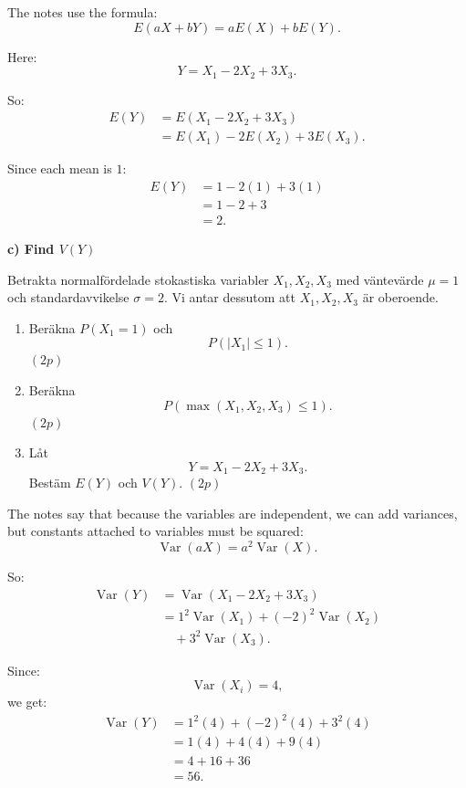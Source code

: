 \documentclass[10pt]{article}
\begin{document}
The notes use the formula:
\[
E(aX+bY)=aE(X)+bE(Y).
\]

Here:
\[
Y=X_1-2X_2+3X_3.
\]

So:
\begin{align*}
E(Y)
&=
E(X_1-2X_2+3X_3)
\\[2mm]
&=
E(X_1)-2E(X_2)+3E(X_3).
\end{align*}

Since each mean is \(1\):
\begin{align*}
E(Y)
&=
1-2(1)+3(1)
\\[2mm]
&=
1-2+3
\\[2mm]
&=
2.
\end{align*}

\textbf{c) Find \(V(Y)\)}

Betrakta normalfördelade stokastiska variabler
\(X_1,X_2,X_3\) med väntevärde \(\mu=1\) och
standardavvikelse \(\sigma=2\). Vi antar dessutom
att \(X_1,X_2,X_3\) är oberoende.

\begin{enumerate}[label=\alph*)]
\item Beräkna \(P(X_1=1)\) och
\[
P(|X_1|\le 1).
\]
\((2p)\)

\item Beräkna
\[
P(\max(X_1,X_2,X_3)\le 1).
\]
\((2p)\)

\item Låt
\[
Y=X_1-2X_2+3X_3.
\]
Bestäm \(E(Y)\) och \(V(Y)\). \((2p)\)
\end{enumerate}

The notes say that because the variables are
independent, we can add variances, but constants
attached to variables must be squared:
\[
\operatorname{Var}(aX)=a^2\operatorname{Var}(X).
\]

So:
\begin{align*}
\operatorname{Var}(Y)
&=
\operatorname{Var}(X_1-2X_2+3X_3)
\\[2mm]
&=
1^2\operatorname{Var}(X_1)
+(-2)^2\operatorname{Var}(X_2)
\\
&\quad
+3^2\operatorname{Var}(X_3).
\end{align*}

Since:
\[
\operatorname{Var}(X_i)=4,
\]
we get:
\begin{align*}
\operatorname{Var}(Y)
&=
1^2(4)+(-2)^2(4)+3^2(4)
\\[2mm]
&=
1(4)+4(4)+9(4)
\\[2mm]
&=
4+16+36
\\[2mm]
&=
56.
\end{align*}
\end{document}
